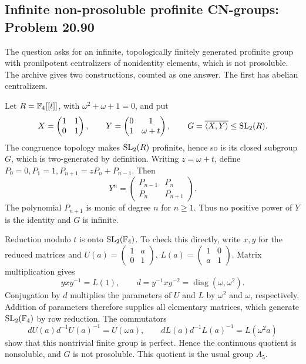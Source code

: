 \subsection{Infinite non-prosoluble profinite CN-groups: Problem 20.90}
\label{cand:20.90}

The question asks for an infinite, topologically finitely generated
profinite group with pronilpotent centralizers of nonidentity elements,
which is not prosoluble. The archive gives two constructions, counted
as one answer. The first has abelian centralizers.

Let \(R=\mathbb F_4[[t]]\), with \(\omega^2+\omega+1=0\), and put
\[
 X=\begin{pmatrix}1&1\\0&1\end{pmatrix},\qquad
 Y=\begin{pmatrix}0&1\\1&\omega+t\end{pmatrix},\qquad
 G=\overline{\langle X,Y\rangle}\leq\operatorname{SL}_2(R).
\]
The congruence topology makes \(\operatorname{SL}_2(R)\) profinite, hence so
is its closed subgroup \(G\), which is two-generated by definition.
Writing \(z=\omega+t\), define
\(P_0=0,P_1=1,P_{n+1}=zP_n+P_{n-1}\). Then
\[
 Y^n=\begin{pmatrix}P_{n-1}&P_n\\P_n&P_{n+1}\end{pmatrix}.
\]
The polynomial \(P_{n+1}\) is monic of degree \(n\) for \(n\geq1\).
Thus no positive power of \(Y\) is the identity and \(G\) is infinite.

Reduction modulo \(t\) is onto \(\operatorname{SL}_2(\mathbb F_4)\). To check this
directly, write \(x,y\) for the reduced matrices and
\(U(a)=\left(\begin{smallmatrix}1&a\\0&1\end{smallmatrix}\right)\),
\(L(a)=\left(\begin{smallmatrix}1&0\\a&1\end{smallmatrix}\right)\).
Matrix multiplication gives
\[
 yxy^{-1}=L(1),\qquad
 d=y^{-1}xy^{-2}=\operatorname{diag}(\omega,\omega^2).
\]
Conjugation by \(d\) multiplies the parameters of \(U\) and \(L\)
by \(\omega^2\) and \(\omega\), respectively. Addition of
parameters therefore supplies all elementary matrices, which
generate \(\operatorname{SL}_2(\mathbb F_4)\) by row reduction. The commutators
\[
 dU(a)d^{-1}U(a)^{-1}=U(\omega a),\qquad
 dL(a)d^{-1}L(a)^{-1}=L(\omega^2a)
\]
show that this nontrivial finite group is perfect. Hence the
continuous quotient is nonsoluble, and \(G\) is not prosoluble.
This quotient is the usual group \(A_5\).


